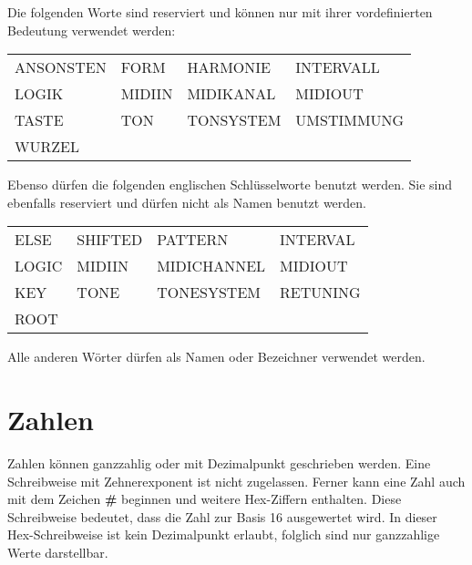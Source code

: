 Die  folgenden  Worte sind reserviert
 und k\"onnen  nur  mit  ihrer
vordefinierten Bedeutung verwendet werden:

\begin{center}
\begin{tabular}{|llll|}
  \hline
  ANSONSTEN & FORM   & HARMONIE  & INTERVALL  \\
  LOGIK     & MIDIIN & MIDIKANAL & MIDIOUT    \\
  TASTE     & TON    & TONSYSTEM & UMSTIMMUNG \\
  WURZEL    &        &           &            \\
  \hline
\end{tabular}
\end{center}

Ebenso dürfen die folgenden englischen Schlüsselworte
benutzt werden. Sie sind ebenfalls reserviert und
dürfen nicht als Namen benutzt werden.

\begin{center}
\begin{tabular}{|llll|}
	      \hline
   ELSE & SHIFTED   & PATTERN & INTERVAL \\
   LOGIC  & MIDIIN   & MIDICHANNEL & MIDIOUT    \\
   KEY     & TONE    & TONESYSTEM &  RETUNING \\
   ROOT    &        &           &              \\
 \hline
\end{tabular}
\end{center}

Alle anderen Wörter dürfen als Namen oder Bezeichner verwendet werden.

\section{Zahlen}\label{sec:zahlen}
\label{zweifuenf}

Zahlen können ganzzahlig oder mit Dezimalpunkt geschrieben werden.
Eine Schreibweise mit Zehnerexponent ist nicht
zugelassen. Ferner kann eine Zahl auch mit dem Zeichen
\textbf{\#}\index{\#} beginnen und weitere Hex-Ziffern
enthalten. Diese Schreibweise bedeutet, dass die Zahl zur Basis 16
ausgewertet wird. In dieser Hex-Schreibweise ist kein Dezimalpunkt
erlaubt, folglich sind nur ganzzahlige Werte darstellbar.

